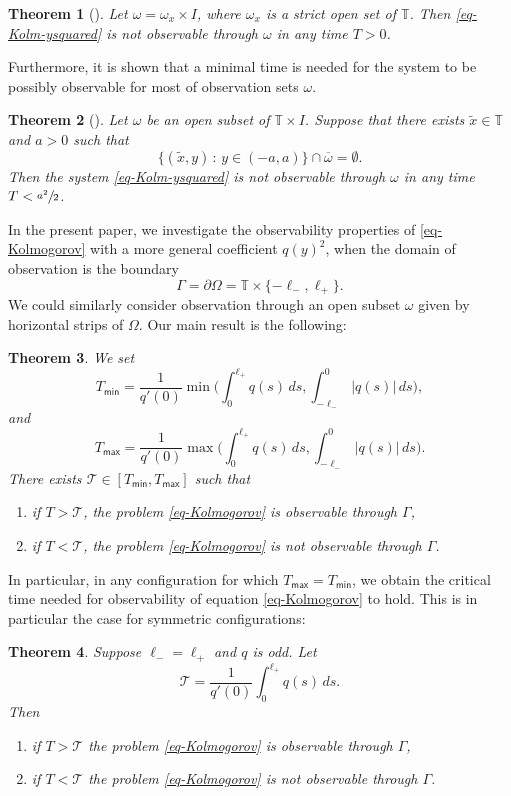 \documentclass[11pt]{article}
\numberwithin{equation}{section}
\let\mathcal\mathscr
\theoremstyle{plain}
\newtheorem{theorem}{{Theorem}}[section]
\theoremstyle{definition}
\newcommand{\1}{\mathds 1}
\newcommand{\st}{\,:\,}
\newcommand{\T}{\mathbb{T}}
\let\o\omega
\let\O\Omega
\newcommand{\Tc}{{\mathcal T}}
\newcommand{\Tmin}{T_{\mathsf{min}}}
\newcommand{\Tmax}{T_{\mathsf{max}}}
\begin{document}
\begin{theorem}[\cite{koenig18}] \label{th-AK1}
Let $\omega = \omega_x \times I$, where $\omega_x$ is a strict open set of $\T$.
Then \eqref{eq-Kolm-ysquared} is not observable through $\omega$ in any time $T>0$.
\end{theorem}

Furthermore, it is shown that a minimal time is needed for the system to be possibly observable for most of observation sets $\omega$.

\begin{theorem}[\cite{koenig18}] \label{th-AK2}
Let $\omega$ be an open subset of $\T \times I$. Suppose that there exists $\tilde x \in \T$ and $a > 0$ such that
\[\lbrace (\tilde x ,y)\st y \in (-a,a)\rbrace \cap \overline{\omega} = \emptyset.\]
Then the system \eqref{eq-Kolm-ysquared} is not observable through $\omega$ in any time $T< \sfrac{a^2}{2}$.
\end{theorem}

In the present paper, we investigate the observability properties of
\eqref{eq-Kolmogorov} with a more general coefficient $q(y)^2$, when the domain of observation is the boundary
\[
\Gamma = \partial \O = \T \times\lbrace -\ell_-, \ell_+\rbrace.
\]
We could similarly consider observation through an open subset $\o$ given by horizontal strips of $\O$. Our main result is the following:

\begin{theorem} \label{th-main}
We set
\[
\Tmin = \frac 1 {q'(0)} \min\biggl(\int_0^{\ell_+} q(s) \, ds , \int_{-\ell_-}^0 \vert q(s) \vert\, ds \biggr),
\]
and
\[
\Tmax = \frac 1 {q'(0)} \max\biggl(\int_0^{\ell_+} q(s) \, ds , \int_{-\ell_-}^0 \vert q(s) \vert\, ds \biggr).
\]
There exists $\Tc \in [\Tmin,\Tmax]$ such that
\begin{enumerate}
\item if $T > \Tc$, the problem \eqref{eq-Kolmogorov} is observable through $\Gamma$, \label{item-th-i}
\item if $T < \Tc$, the problem \eqref{eq-Kolmogorov} is not observable through $\Gamma$. \label{item-th-ii}
\end{enumerate}
\end{theorem}

In particular, in any configuration for which $\Tmax=\Tmin$, we obtain the critical time needed
for observability of equation \eqref{eq-Kolmogorov} to hold. This is in particular the case for symmetric configurations:

\begin{theorem} \label{th-cas-symetrique}
Suppose $\ell_- = \ell_+$ and $q$ is odd. Let
\[
\Tc = \frac{1}{q'(0)} \int_0^{\ell_+} q(s) \, ds.
\]
Then
\begin{enumerate}
\item if $T > \Tc$ the problem \eqref{eq-Kolmogorov} is observable through $\Gamma$,
\item if $T < \Tc$ the problem \eqref{eq-Kolmogorov} is not observable through $\Gamma$.
\end{enumerate}
\end{theorem}
\end{document}
